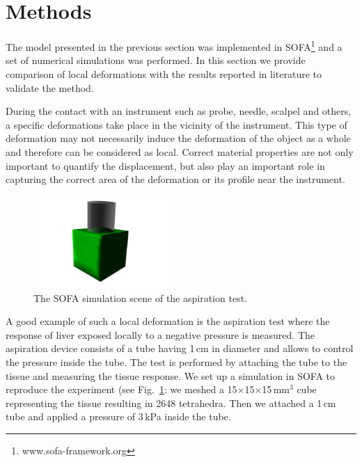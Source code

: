 \documentclass{acm_proc_article-sp}
\begin{document}
\section{Methods} %
The model presented in the previous section was implemented in 
SOFA\footnote{www.sofa-framework.org} and a set of
numerical simulations was performed.
In this section we provide comparison of local deformations with the
results reported in literature to validate the method.

During the contact with an instrument such as probe, needle, scalpel and others,
a specific deformations take place in the vicinity of
the instrument. This type of deformation may not necessarily induce the
deformation of the object as a whole and therefore can be considered as
local. Correct material properties are not only important to quantify the
displacement, but also play an important role in capturing the correct area of
the deformation or its profile near the instrument.

\begin{figure}
  \centering
  \includegraphics[height=3.5cm]{aspiration.jpg}
  \caption{\label{fig-aspiration1} The SOFA simulation scene of the aspiration test.}
\end{figure}

A good example of such a local deformation is the aspiration test
where the response of liver exposed locally to a negative pressure is measured.
The aspiration device consists of a tube having 1\,cm in diameter and allows to
control the pressure inside the tube. The test is performed by
attaching the tube to the tissue and measuring the tissue response. We
set up a simulation in SOFA to reproduce the experiment (see
Fig.~\ref{fig-aspiration1}: we meshed a 15$\times$15$\times$15\,mm$^3$ 
cube representing the tissue resulting in 2648 tetrahedra. Then we attached a 1\,cm tube 
and applied a pressure of 3\,kPa inside the tube. 
\end{document}
